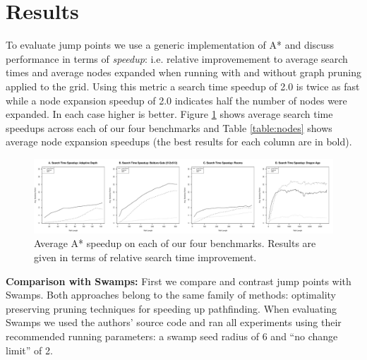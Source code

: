 \section{Results}
To evaluate jump points we use a generic implementation of A* and discuss
performance in terms of \emph{speedup}: i.e. relative improvemement to average 
search times and average nodes expanded when running with and without 
graph pruning applied to the grid.  Using this metric a search time speedup
of 2.0 is twice as fast while a node expansion speedup of 2.0 indicates half the
number of nodes were expanded.  In each case higher is better.
Figure \ref{fig:speedup} shows average search time speedups across
each of our four benchmarks and Table \ref{table:nodes} shows average
node expansion speedups (the best results for each column are in bold).



\begin{figure}[t]
   \begin{center}
	   \includegraphics[width=2.0\columnwidth, trim = 10mm 10mm 10mm 0mm]
		{diagrams/speedup.pdf}
   \end{center}
   \caption{Average A* speedup on each of our four benchmarks. 
	Results are given in terms of relative search time improvement.}
\label{fig:speedup}
\end{figure}


\textbf{Comparison with Swamps: }
First we compare and contrast jump points with Swamps\cite{pochter10}.
Both approaches belong to the same family of methods:
optimality preserving pruning techniques for speeding up pathfinding.
When evaluating Swamps we used the authors'
source code and ran all experiments using their recommended running parameters:
a swamp seed radius of 6 and ``no change limit'' of 2. 

